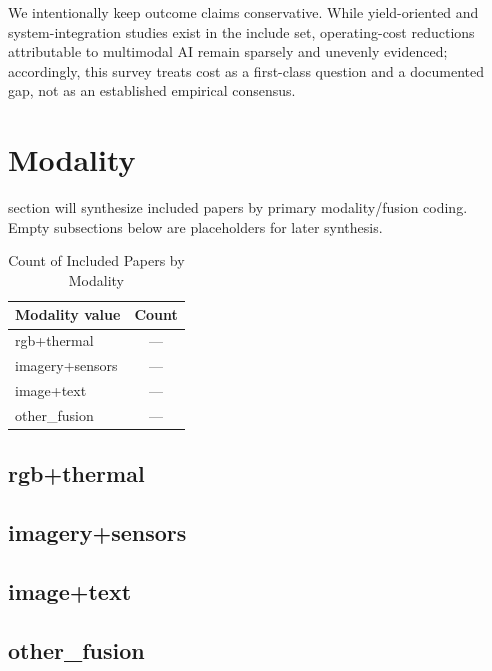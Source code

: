\documentclass[lettersize,journal]{IEEEtran}
\begin{document}
We intentionally keep outcome claims conservative. While yield-oriented and system-integration studies exist in the include set, operating-cost reductions attributable to multimodal AI remain sparsely and unevenly evidenced; accordingly, this survey treats cost as a first-class question and a documented gap, not as an established empirical consensus.








\newpage



\section{Modality}
 section will synthesize included papers by primary modality/fusion coding.
Empty subsections below are placeholders for later synthesis.

\begin{table}[H]
\caption{Count of Included Papers by Modality}
\label{tab:modality_counts}
\centering
\begin{tabular}{|l|c|}
\hline
Modality value & Count\\
\hline
rgb+thermal & ---\\
imagery+sensors & ---\\
image+text & ---\\
other\_fusion & ---\\
\hline
\end{tabular}
\end{table}

\subsection{rgb+thermal}

\subsection{imagery+sensors}

\subsection{image+text}

\subsection{other\_fusion}
\end{document}
